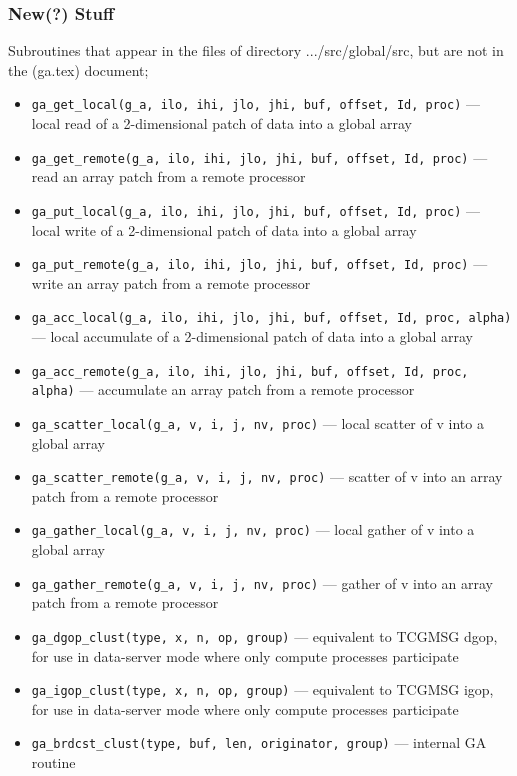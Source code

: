 \subsubsection{New(?) Stuff}

Subroutines that appear in the files of directory .../src/global/src, but
are not in the (ga.tex) document;

\begin{itemize}
\item {\tt ga\_get\_local(g\_a, ilo, ihi, jlo, jhi, buf, offset, Id, proc)} --- local
read of a 2-dimensional patch of data into a global array
\item {\tt ga\_get\_remote(g\_a, ilo, ihi, jlo, jhi, buf, offset, Id, proc)} --- read an
array patch from a remote processor
\item {\tt ga\_put\_local(g\_a, ilo, ihi, jlo, jhi, buf, offset, Id, proc)} --- local
write of a 2-dimensional patch of data into a global array
\item {\tt ga\_put\_remote(g\_a, ilo, ihi, jlo, jhi, buf, offset, Id, proc)} --- write an
array patch from a remote processor
\item {\tt ga\_acc\_local(g\_a, ilo, ihi, jlo, jhi, buf, offset, Id, proc, alpha)} --- local
accumulate of a 2-dimensional patch of data into a global array
\item {\tt ga\_acc\_remote(g\_a, ilo, ihi, jlo, jhi, buf, offset, Id, proc, alpha)} --- accumulate an
array patch from a remote processor
\item {\tt ga\_scatter\_local(g\_a, v, i, j, nv, proc)} --- local
scatter of v into a global array
\item {\tt ga\_scatter\_remote(g\_a, v, i, j, nv, proc)} --- scatter of v into an
array patch from a remote processor
\item {\tt ga\_gather\_local(g\_a, v, i, j, nv, proc)} --- local
gather of v into a global array
\item {\tt ga\_gather\_remote(g\_a, v, i, j, nv, proc)} --- gather of v into an
array patch from a remote processor
\item {\tt ga\_dgop\_clust(type, x, n, op, group)} --- equivalent to TCGMSG dgop, for use in data-server
mode where only compute processes participate
\item {\tt ga\_igop\_clust(type, x, n, op, group)} --- equivalent to TCGMSG igop, for use in data-server
mode where only compute processes participate
\item {\tt ga\_brdcst\_clust(type, buf, len, originator, group)} --- internal GA routine

\end{itemize}
